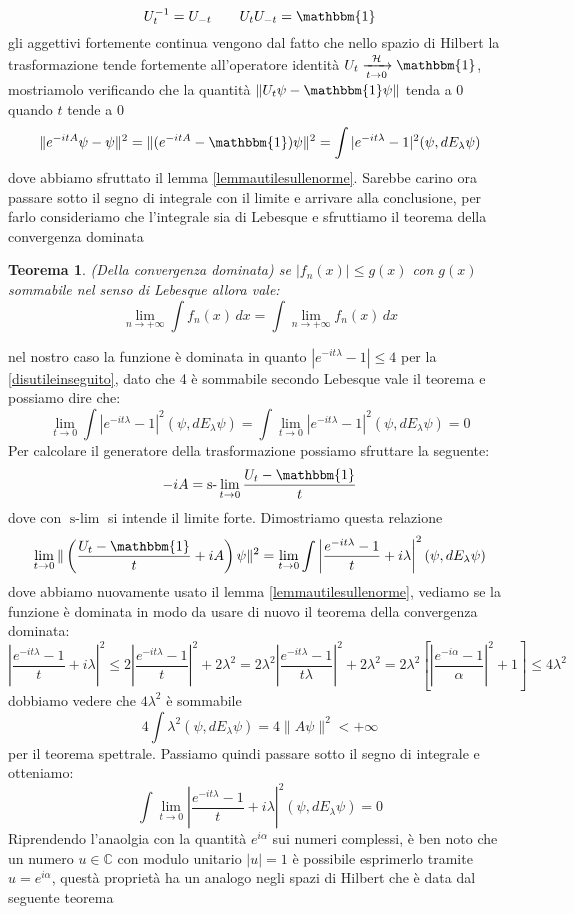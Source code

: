 \documentclass[12pt]{book}
\theoremstyle{plain}
\newcommand{\C}{\mathbb{C}}
\renewcommand{\H}{\mathcal{H}}
\newtheorem{thm}{Teorema}[section]
\theoremstyle{definition}
\theoremstyle{remark}
\begin{document}
\[U_t^{-1} = U_{-t} \qquad U_tU_{-t} = \mathbbm{1}\]
gli aggettivi fortemente continua vengono dal fatto che nello spazio di Hilbert la trasformazione tende fortemente all'operatore identità $U_t \xrightarrow[t\to 0]{\H} \mathbbm{1}$, mostriamolo verificando che la quantità $\|U_t\psi - \mathbbm{1}\psi\|$ tenda a 0 quando $t$ tende a 0
\[\|e^{-itA}\psi -\psi\|^2 = \|(e^{-itA}-\mathbbm{1})\psi\|^2 = \int |e^{-it\lambda}-1|^2(\psi,dE_\lambda\psi) \]
dove abbiamo sfruttato il lemma \eqref{lemmautilesullenorme}. Sarebbe carino ora passare sotto il segno di integrale con il limite e arrivare alla conclusione, per farlo consideriamo che l'integrale sia di Lebesque e sfruttiamo il teorema della convergenza dominata
\begin{thm}
(Della convergenza dominata)
se $|f_n(x)|\leq g(x)$ con $g(x)$ sommabile nel senso di Lebesque allora vale:
\[\lim_{n\to+\infty} \int f_n(x)\,dx = \int \lim_{n\to+\infty} f_n(x)\,dx\]
\end{thm}
nel nostro caso la funzione è dominata in quanto $|e^{-it\lambda}-1|\leq 4$ per la \eqref{disutileinseguito}, dato che 4 è sommabile secondo Lebesque vale il teorema e possiamo dire che:
\[\lim_{t\to0}\int |e^{-it\lambda}-1|^2(\psi,dE_\lambda\psi)  = \int \lim_{t\to 0}|e^{-it\lambda}-1|^2(\psi,dE_\lambda\psi) = 0\]
Per calcolare il generatore della trasformazione possiamo sfruttare la seguente:
\begin{equation}\label{generatore}
-iA = \text{s-}\lim_{t\to 0} \frac{U_t-\mathbbm{1}}{t}
\end{equation}
dove con $\text{s-}\lim$ si intende il limite forte. Dimostriamo questa relazione
\[\lim_{t\to0} \|\left(\frac{U_t-\mathbbm{1}}{t} +iA\right)\psi\|^2 = \lim_{t\to 0}\int\left|\frac{e^{-it\lambda}-1}{t} +i\lambda\right|^2(\psi,dE_\lambda\psi)\]
dove abbiamo nuovamente usato il lemma \eqref{lemmautilesullenorme}, vediamo se la funzione è dominata in modo da usare di nuovo il teorema della convergenza dominata:
\[ \left|\frac{e^{-it\lambda}-1}{t} +i\lambda\right|^2\leq 2\left|\frac{e^{-it\lambda}-1}{t}\right|^2 + 2\lambda^2 = 2\lambda^2\left|\frac{e^{-it\lambda}-1}{t\lambda}\right|^2+ 2\lambda^2  = 2\lambda^2\left[\left|\frac{e^{-i\alpha}-1}{\alpha}\right|^2+1  \right] \leq 4\lambda^2\]
dobbiamo vedere che $4\lambda^2$ è sommabile
\[4\int\lambda^2(\psi,dE_\lambda\psi) = 4\|A\psi\|^2<+\infty\]
per il teorema spettrale. Passiamo quindi passare sotto il segno di integrale e otteniamo:
\[\int\lim_{t\to 0}\left|\frac{e^{-it\lambda}-1}{t} +i\lambda\right|^2(\psi,dE_\lambda\psi) = 0\]
Riprendendo l'anaolgia con la quantità $e^{i\alpha}$ sui numeri complessi, è ben noto che un numero $u\in\C$ con modulo unitario $|u|=1$ è possibile esprimerlo tramite $u = e^{i\alpha}$, questà proprietà ha un analogo negli spazi di Hilbert che è data dal seguente teorema
\end{document}
